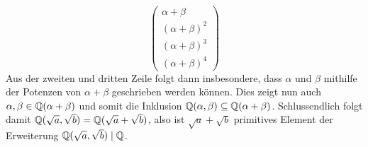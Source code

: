 \begin{exercisePage}
\begin{equation*}
\begin{pmatrix}
		\alpha + \beta \\ (\alpha + \beta)^2 \\ (\alpha + \beta)^3 \\ (\alpha + \beta)^4
		\end{pmatrix}
	\end{equation*}
	Aus der zweiten und dritten Zeile folgt dann insbesondere, dass $\alpha$ und $\beta$ mithilfe der Potenzen von $\alpha + \beta$ geschrieben werden können. Dies zeigt nun auch $\alpha, \beta \in \mathbb{Q}(\alpha + \beta)$ und somit die Inklusion $\mathbb{Q}(\alpha, \beta) \subseteq \mathbb{Q}(\alpha + \beta)$. Schlussendlich folgt damit $\mathbb{Q}(\sqrt{a},\sqrt{b}) = \mathbb{Q}(\sqrt{a} + \sqrt{b})$, also ist $\sqrt{a} + \sqrt{b}$ primitives Element der Erweiterung $\mathbb{Q}(\sqrt{a},\sqrt{b}) \mid \mathbb{Q}$.

\end{exercisePage}